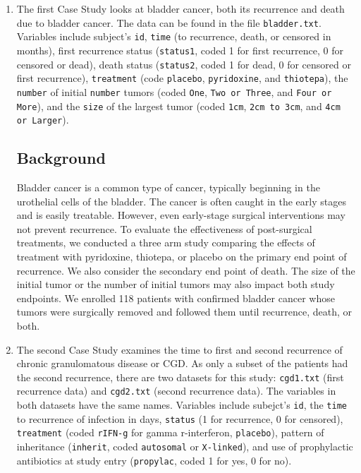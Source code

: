 \documentclass{article}
\begin{document}
	\begin{enumerate}
		\item The first Case Study looks at bladder cancer, both its recurrence and death due to bladder cancer. The data can be found in the file \texttt{bladder.txt}. Variables include subject's \texttt{id}, \texttt{time} (to recurrence, death, or censored in months), first recurrence status (\texttt{status1}, coded 1 for first recurrence, 0 for censored or dead), death status (\texttt{status2}, coded 1 for dead, 0 for censored or first recurrence), \texttt{treatment} (code \texttt{placebo}, \texttt{pyridoxine}, and \texttt{thiotepa}), the \texttt{number} of initial \texttt{number} tumors (coded \texttt{One}, \texttt{Two or Three}, and \texttt{Four or More}), and the \texttt{size} of the largest tumor (coded \texttt{1cm}, \texttt{2cm to 3cm}, and \texttt{4cm or Larger}).
			
	\subsection*{Background}

	Bladder cancer is a common type of cancer, typically beginning in the urothelial cells of the bladder. The cancer is often caught in the early stages and is easily treatable. However, even early-stage surgical interventions may not prevent recurrence. To evaluate the effectiveness of post-surgical treatments, we conducted a three arm study comparing the effects of treatment with pyridoxine, thiotepa, or placebo on the primary end point of recurrence. We also consider the secondary end point of death. The size of the initial tumor or the number of initial tumors may also impact both study endpoints. We enrolled 118 patients with confirmed bladder cancer whose tumors were surgically removed and followed them until recurrence, death, or both.
		
		\item The second Case Study examines the time to first and second recurrence of chronic granulomatous disease or CGD. As only a subset of the patients had the second recurrence, there are two datasets for this study: \texttt{cgd1.txt} (first recurrence data) and \texttt{cgd2.txt} (second recurrence data). The variables in both datasets have the same names. Variables include subejct's \texttt{id}, the \texttt{time} to recurrence of infection in days, \texttt{status} (1 for recurrence, 0 for censored), \texttt{treatment} (coded \texttt{rIFN-g} for gamma r-interferon, \texttt{placebo}), pattern of inheritance (\texttt{inherit}, coded \texttt{autosomal} or \texttt{X-linked}), and use of prophylactic antibiotics at study entry (\texttt{propylac}, coded 1 for yes, 0 for no).


\end{enumerate}
\end{document}
